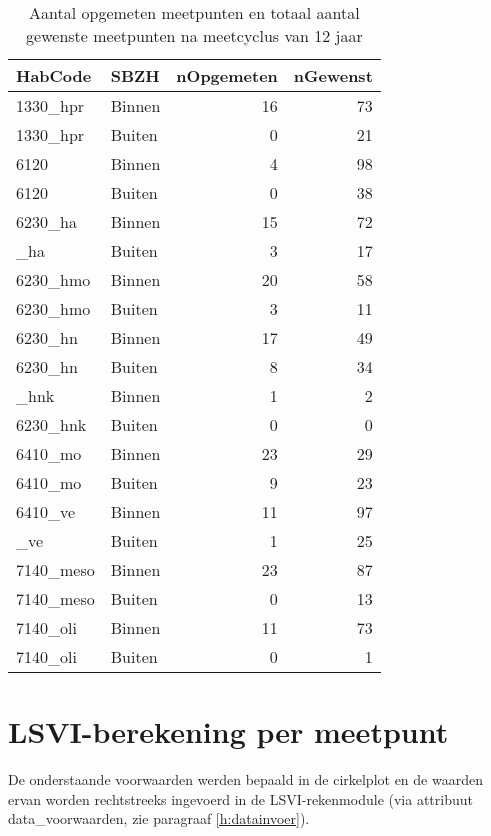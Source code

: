\documentclass[twoside]{extreport}
\begin{document}
\begin{table}[!h]

\caption{\label{tab:tabAantallen}Aantal opgemeten meetpunten en totaal aantal gewenste meetpunten na meetcyclus van 12 jaar}
\centering
\begin{tabular}{llrr}
\toprule
HabCode & SBZH & nOpgemeten & nGewenst\\
\midrule
1330\_hpr & Binnen & 16 & 73\\
1330\_hpr & Buiten & 0 & 21\\
6120 & Binnen & 4 & 98\\
6120 & Buiten & 0 & 38\\
6230\_ha & Binnen & 15 & 72\\
\addlinespace
6230\_ha & Buiten & 3 & 17\\
6230\_hmo & Binnen & 20 & 58\\
6230\_hmo & Buiten & 3 & 11\\
6230\_hn & Binnen & 17 & 49\\
6230\_hn & Buiten & 8 & 34\\
\addlinespace
6230\_hnk & Binnen & 1 & 2\\
6230\_hnk & Buiten & 0 & 0\\
6410\_mo & Binnen & 23 & 29\\
6410\_mo & Buiten & 9 & 23\\
6410\_ve & Binnen & 11 & 97\\
\addlinespace
6410\_ve & Buiten & 1 & 25\\
7140\_meso & Binnen & 23 & 87\\
7140\_meso & Buiten & 0 & 13\\
7140\_oli & Binnen & 11 & 73\\
7140\_oli & Buiten & 0 & 1\\
\bottomrule
\end{tabular}
\end{table}

\needspace{50mm}

\section{LSVI-berekening per
meetpunt}\label{lsvi-berekening-per-meetpunt}

\needspace{50mm}

De onderstaande voorwaarden werden bepaald in de cirkelplot en de
waarden ervan worden rechtstreeks ingevoerd in de LSVI-rekenmodule (via
attribuut data\_voorwaarden, zie paragraaf \ref{h:datainvoer}).
\end{document}
